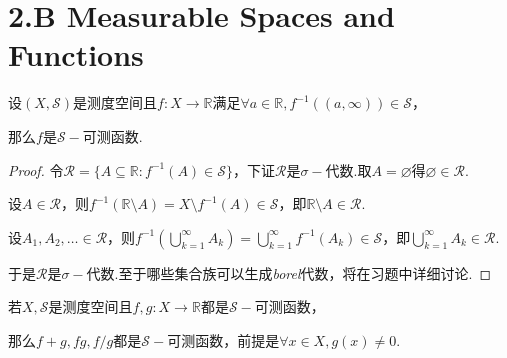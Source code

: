 \section{2.B Measurable Spaces and Functions}

\begin{theorem}[2.39]\label{2.39}
    设\((X,\mathcal{S})\)是测度空间且\(f:X \to \mathbb{R}\)满足\(\forall a \in \mathbb{R}, f^{-1}((a,\infty)) \in \mathcal{S}\)，

    那么\(f\)是\(\mathcal{S}-\)可测函数.
\end{theorem}

\begin{proof}
    令\(\mathcal{R}=\{A \subseteq \mathbb{R}:f^{-1}(A) \in \mathcal{S}\}\)，下证\(\mathcal{R}\)是\(\sigma-\)代数.取\(A=\varnothing\)得\(\varnothing \in \mathcal{R}\).
    
    设\(A \in \mathcal{R}\)，则\(f^{-1}(\mathbb{R} \setminus A)=X \setminus f^{-1}(A) \in \mathcal{S}\)，即\(\mathbb{R} \setminus A \in \mathcal{R}\).

    设\(A_1, A_2, \dots \in \mathcal{R}\)，则\(f^{-1}(\bigcup_{k=1}^\infty A_k)=\bigcup_{k=1}^\infty f^{-1}(A_k) \in \mathcal{S}\)，即\(\bigcup_{k=1}^\infty A_k \in \mathcal{R}\).

    {\kaishu 于是\(\mathcal{R}\)是\(\sigma-\)代数.至于哪些集合族可以生成\textit{borel}代数，将在习题中详细讨论.}
\end{proof}

\begin{theorem}[2.46]\label{2.46}
    若\(X,\mathcal{S}\)是测度空间且\(f,g:X \to \mathbb{R}\)都是\(\mathcal{S}-\)可测函数，

    那么\(f+g, fg, f/g\)都是\(\mathcal{S}-\)可测函数，前提是\(\forall x \in X, g(x) \ne 0\).
\end{theorem}

